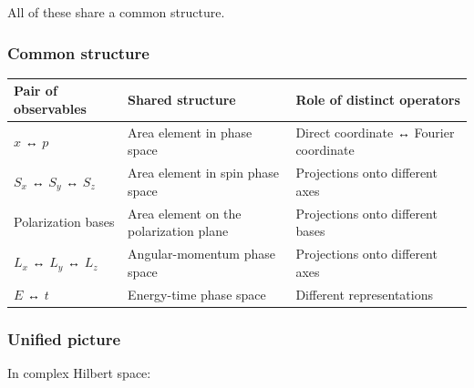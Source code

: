 \documentclass[
]{article}
\newcounter{none} %
\begin{document}
All of these share a common structure.

\subsubsection{Common structure}\label{common-structure}

{\def\LTcaptype{none} %
\begin{longtable}[]{@{}
  >{\raggedright\arraybackslash}p{}
  >{\raggedright\arraybackslash}p{}
  >{\raggedright\arraybackslash}p{}@{}}
\toprule\noalign{}
\begin{minipage}[b]{\linewidth}\raggedright
Pair of observables
\end{minipage} & \begin{minipage}[b]{\linewidth}\raggedright
Shared structure
\end{minipage} & \begin{minipage}[b]{\linewidth}\raggedright
Role of distinct operators
\end{minipage} \\
\midrule\noalign{}
\endhead
\bottomrule\noalign{}
\endlastfoot
\(x\) ↔ \(p\) & Area element in phase space & Direct coordinate ↔
Fourier coordinate \\
\(S_x\) ↔ \(S_y\) ↔ \(S_z\) & Area element in spin phase space &
Projections onto different axes \\
Polarization bases & Area element on the polarization plane &
Projections onto different bases \\
\(L_x\) ↔ \(L_y\) ↔ \(L_z\) & Angular-momentum phase space & Projections
onto different axes \\
\(E\) ↔ \(t\) & Energy-time phase space & Different representations \\
\end{longtable}
}

\subsubsection{Unified picture}\label{unified-picture}

In complex Hilbert space:
\end{document}
